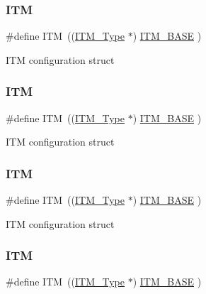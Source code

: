 \subsubsection{\texorpdfstring{ITM}{ITM}\hspace{0.1cm}{\footnotesize\ttfamily [3/6]}}
{\footnotesize\ttfamily \#define I\+TM~((\mbox{\hyperlink{struct_i_t_m___type}{I\+T\+M\+\_\+\+Type}}       $\ast$)     \mbox{\hyperlink{group___c_m_s_i_s__core__base_gadd76251e412a195ec0a8f47227a8359e}{I\+T\+M\+\_\+\+B\+A\+SE}}      )}

I\+TM configuration struct \mbox{\label{group___c_m_s_i_s__core__base_gabae7cdf882def602cb787bb039ff6a43}} 
\subsubsection{\texorpdfstring{ITM}{ITM}\hspace{0.1cm}{\footnotesize\ttfamily [4/6]}}
{\footnotesize\ttfamily \#define I\+TM~((\mbox{\hyperlink{struct_i_t_m___type}{I\+T\+M\+\_\+\+Type}}       $\ast$)     \mbox{\hyperlink{group___c_m_s_i_s__core__base_gadd76251e412a195ec0a8f47227a8359e}{I\+T\+M\+\_\+\+B\+A\+SE}}      )}

I\+TM configuration struct \mbox{\label{group___c_m_s_i_s__core__base_gabae7cdf882def602cb787bb039ff6a43}} 
\subsubsection{\texorpdfstring{ITM}{ITM}\hspace{0.1cm}{\footnotesize\ttfamily [5/6]}}
{\footnotesize\ttfamily \#define I\+TM~((\mbox{\hyperlink{struct_i_t_m___type}{I\+T\+M\+\_\+\+Type}}       $\ast$)     \mbox{\hyperlink{group___c_m_s_i_s__core__base_gadd76251e412a195ec0a8f47227a8359e}{I\+T\+M\+\_\+\+B\+A\+SE}}         )}

I\+TM configuration struct \mbox{\label{group___c_m_s_i_s__core__base_gabae7cdf882def602cb787bb039ff6a43}} 
\subsubsection{\texorpdfstring{ITM}{ITM}\hspace{0.1cm}{\footnotesize\ttfamily [6/6]}}
{\footnotesize\ttfamily \#define I\+TM~((\mbox{\hyperlink{struct_i_t_m___type}{I\+T\+M\+\_\+\+Type}}       $\ast$)     \mbox{\hyperlink{group___c_m_s_i_s__core__base_gadd76251e412a195ec0a8f47227a8359e}{I\+T\+M\+\_\+\+B\+A\+SE}}         )}

